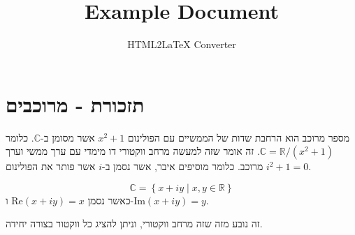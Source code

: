 \documentclass{tstextbook}
\begin{document}
\title{Example Document}
\author{HTML2LaTeX Converter}
\maketitle


\section{תזכורת - מרוכבים}

מספר מרוכב הוא הרחבת שדות של הממשיים עם הפולינום \(x^2+1\) אשר מסומן ב-\(\mathbb{C}\). כלומר \(\mathbb{C}=\mathbb{R} / (x^2+1)\). זה אומר שזה למעשה מרחב ווקטורי דו מימדי עם ערך ממשי וערך מרוכב. כלומר מוסיפים איבר, אשר נסמן ב-\(i\) אשר פותר את הפולינום \(i^2+1=0\). 

\begin{proposition}
$$\mathbb{C}=\left\{  x+iy\mid x,y \in \mathbb{R}  \right\}$$
כאשר נסמן \(\mathrm{Re}(x+iy)=x\) ו-\(\mathrm{Im}(x+iy)=y\).

\end{proposition}
זה נובע מזה שזה מרחב ווקטורי, וניתן להציג כל ווקטור בצורה יחידה.
\end{document}
